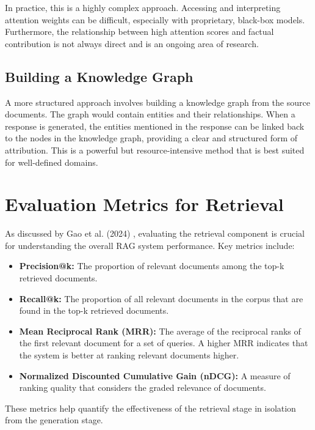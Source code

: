 In practice, this is a highly complex approach. Accessing and interpreting attention weights can be difficult, especially with proprietary, black-box models. Furthermore, the relationship between high attention scores and factual contribution is not always direct and is an ongoing area of research.

\subsection{Building a Knowledge Graph}
A more structured approach involves building a knowledge graph from the source documents. The graph would contain entities and their relationships. When a response is generated, the entities mentioned in the response can be linked back to the nodes in the knowledge graph, providing a clear and structured form of attribution. This is a powerful but resource-intensive method that is best suited for well-defined domains.

\section{Evaluation Metrics for Retrieval}
As discussed by Gao et al. (2024) \autocite{gao2024retrievalaugmented}, evaluating the retrieval component is crucial for understanding the overall RAG system performance. Key metrics include:
\begin{itemize}
    \item \textbf{Precision@k:} The proportion of relevant documents among the top-k retrieved documents.
    \item \textbf{Recall@k:} The proportion of all relevant documents in the corpus that are found in the top-k retrieved documents.
    \item \textbf{Mean Reciprocal Rank (MRR):} The average of the reciprocal ranks of the first relevant document for a set of queries. A higher MRR indicates that the system is better at ranking relevant documents higher.
    \item \textbf{Normalized Discounted Cumulative Gain (nDCG):} A measure of ranking quality that considers the graded relevance of documents.
\end{itemize}
These metrics help quantify the effectiveness of the retrieval stage in isolation from the generation stage.
